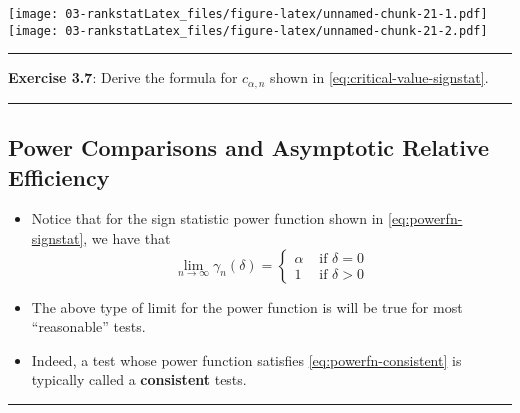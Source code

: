\documentclass[]{book}
\begin{document}
\texttt{[image: 03-rankstatLatex\_files/figure-latex/unnamed-chunk-21-1.pdf]} \texttt{[image: 03-rankstatLatex\_files/figure-latex/unnamed-chunk-21-2.pdf]}

\begin{center}\rule{0.5\linewidth}{\linethickness}\end{center}

\textbf{Exercise 3.7}: Derive the formula for \(c_{\alpha, n}\) shown in \eqref{eq:critical-value-signstat}.

\begin{center}\rule{0.5\linewidth}{\linethickness}\end{center}

\hypertarget{power-comparisons-and-asymptotic-relative-efficiency}{%
\subsection{Power Comparisons and Asymptotic Relative Efficiency}\label{power-comparisons-and-asymptotic-relative-efficiency}}

\begin{itemize}
\item
  Notice that for the sign statistic power function shown in \eqref{eq:powerfn-signstat},
  we have that
  \begin{equation}
  \lim_{n \longrightarrow \infty} \gamma_{n}(\delta)
  = \begin{cases}
  \alpha & \textrm{ if } \delta = 0 \\
  1 & \textrm{ if } \delta > 0
  \end{cases}
  \label{eq:powerfn-consistent}
  \end{equation}
\item
  The above type of limit for the power function is will be
  true for most ``reasonable'' tests.
\item
  Indeed, a test whose power function satisfies
  \eqref{eq:powerfn-consistent} is typically called a \textbf{consistent} tests.
\end{itemize}

\begin{center}\rule{0.5\linewidth}{\linethickness}\end{center}
\end{document}
